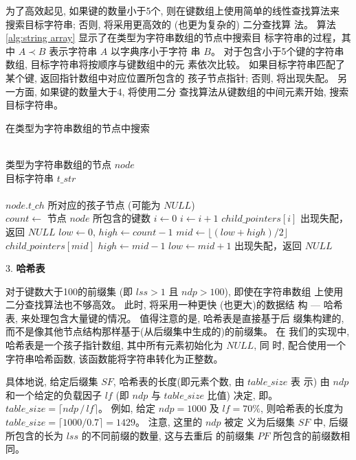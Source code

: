 为了高效起见, 如果键的数量小于5个, 则在键数组上使用简单的线性查找算法来
搜索目标字符串; 否则, 将采用更高效的 (也更为复杂的) 二分查找算
法。 算法 \ref{alg:string array} 显示了在类型为字符串数组的节点中搜索目
标字符串的过程，其中 $A \prec B$ 表示字符串 $A$ 以字典序小于字符
串 $B$。 对于包含小于5个键的字符串数组, 目标字符串将按顺序与键数组中的元
素依次比较。 如果目标字符串匹配了某个键, 返回指针数组中对应位置所包含的
孩子节点指针; 否则, 将出现失配。 另一方面, 如果键的数量大于4, 将使用二分
查找算法从键数组的中间元素开始, 搜索目标字符串。

\begin{algorithm}
  \caption{在类型为字符串数组的节点中搜索}
  \label{alg:string array}
  \begin{algorithmic}[1]
    \REQUIRE ~~\\
    类型为字符串数组的节点 $node$ \\
    目标字符串 $t\_str$\\
    \ENSURE ~~\\
     $node.t\_ch$ 所对应的孩子节点 (可能为 $NULL$)\\
    \STATE
    \STATE $count \leftarrow$ 节点 $node$  所包含的键数
    \STATE
    \STATE $i \leftarrow 0$
    \STATE $i \leftarrow i+1$
    \ENDWHILE
    \RETURN $child\_pointers[i]$
    \ELSE
    \STATE 出现失配，返回 $NULL$
    \ENDIF
    \ELSE
    \STATE $low \leftarrow 0$, $high \leftarrow count-1$
    \STATE $mid \leftarrow \lfloor (low+high)/2 \rfloor$
    \RETURN $child\_pointers[mid]$
    \STATE $high \leftarrow mid - 1$
    \ELSE
    \STATE $low \leftarrow mid + 1$
    \ENDIF
    \ENDWHILE
    \STATE 出现失配，返回 $NULL$
    \ENDIF
  \end{algorithmic}
\end{algorithm}

3. \textbf{哈希表}

对于键数大于100的前缀集 (即 $lss > 1$ 且 $ndp > 100$), 即使在字符串数组
上使用二分查找算法也不够高效。 此时, 将采用一种更快 (也更大)的数据结
构 --- 哈希表, 来处理包含大量键的情况。 值得注意的是, 哈希表是直接基于后
缀集构建的, 而不是像其他节点结构那样基于(从后缀集中生成的)的前缀集。 在
我们的实现中, 哈希表是一个孩子指针数组, 其中所有元素初始化为 $NULL$, 同
时, 配合使用一个字符串哈希函数, 该函数能将字符串转化为正整数。

具体地说, 给定后缀集 $SF$, 哈希表的长度(即元素个数, 由 $table\_size$ 表
示) 由 $ndp$ 和一个给定的负载因子 $lf$
(即 $ndp$ 与 $table\_size$ 比值) 决定, 即。
$table\_size = \lceil ndp\,/\,lf \rceil$。 例如, 给定 $ndp =
1000$ 及 $lf = 70\%$, 则哈希表的长度为
$table\_size = \lceil 1000/0.7 \rceil = 1429$。 注意, 这里的 $ndp$ 被定
义为后缀集 $SF$ 中, 后缀所包含的长为 $lss$ 的不同前缀的数量, 这与去重后
的前缀集 $PF$ 所包含的前缀数相同。

